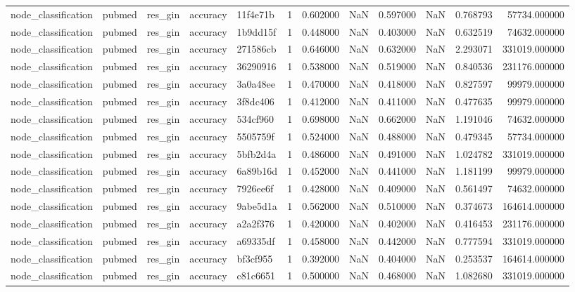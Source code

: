 \begin{tabular}{lllllrrrrrrr}
node_classification & pubmed & res_gin & accuracy & 11f4e71b & 1 & 0.602000 & NaN & 0.597000 & NaN & 0.768793 & 57734.000000 \\
node_classification & pubmed & res_gin & accuracy & 1b9dd15f & 1 & 0.448000 & NaN & 0.403000 & NaN & 0.632519 & 74632.000000 \\
node_classification & pubmed & res_gin & accuracy & 271586cb & 1 & 0.646000 & NaN & 0.632000 & NaN & 2.293071 & 331019.000000 \\
node_classification & pubmed & res_gin & accuracy & 36290916 & 1 & 0.538000 & NaN & 0.519000 & NaN & 0.840536 & 231176.000000 \\
node_classification & pubmed & res_gin & accuracy & 3a0a48ee & 1 & 0.470000 & NaN & 0.418000 & NaN & 0.827597 & 99979.000000 \\
node_classification & pubmed & res_gin & accuracy & 3f8dc406 & 1 & 0.412000 & NaN & 0.411000 & NaN & 0.477635 & 99979.000000 \\
node_classification & pubmed & res_gin & accuracy & 534cf960 & 1 & 0.698000 & NaN & 0.662000 & NaN & 1.191046 & 74632.000000 \\
node_classification & pubmed & res_gin & accuracy & 5505759f & 1 & 0.524000 & NaN & 0.488000 & NaN & 0.479345 & 57734.000000 \\
node_classification & pubmed & res_gin & accuracy & 5bfb2d4a & 1 & 0.486000 & NaN & 0.491000 & NaN & 1.024782 & 331019.000000 \\
node_classification & pubmed & res_gin & accuracy & 6a89b16d & 1 & 0.452000 & NaN & 0.441000 & NaN & 1.181199 & 99979.000000 \\
node_classification & pubmed & res_gin & accuracy & 7926ee6f & 1 & 0.428000 & NaN & 0.409000 & NaN & 0.561497 & 74632.000000 \\
node_classification & pubmed & res_gin & accuracy & 9abe5d1a & 1 & 0.562000 & NaN & 0.510000 & NaN & 0.374673 & 164614.000000 \\
node_classification & pubmed & res_gin & accuracy & a2a2f376 & 1 & 0.420000 & NaN & 0.402000 & NaN & 0.416453 & 231176.000000 \\
node_classification & pubmed & res_gin & accuracy & a69335df & 1 & 0.458000 & NaN & 0.442000 & NaN & 0.777594 & 331019.000000 \\
node_classification & pubmed & res_gin & accuracy & bf3cf955 & 1 & 0.392000 & NaN & 0.404000 & NaN & 0.253537 & 164614.000000 \\
node_classification & pubmed & res_gin & accuracy & c81c6651 & 1 & 0.500000 & NaN & 0.468000 & NaN & 1.082680 & 331019.000000 \\

\end{tabular}

